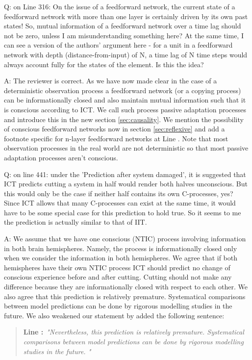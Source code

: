 \documentclass[utf8]{article}
\newcounter{cQuestion}[section]
\newenvironment{question}
    {\refstepcounter{cQuestion}\color{Blue}\noindent\newline Q\thecQuestion:}
    {~\newline}
\newenvironment{ans}  
    {\color{Black}\noindent A:}
    {~\newline}
\newcommand{\addnew}[2]{\blockcquote{}{\textbf{Line #1:}~\newline\textit{"#2"}}
}
\begin{document}
    
    	\begin{question}
            on Line 316: On the issue of a feedforward network, the current state of a feedforward network with more than one layer is certainly driven by its own past states! So, mutual information of a feedforward network over a time lag should not be zero, unless I am misunderstanding something here?
			At the same time, I can see a version of the authors' argument here - for a unit in a feedforward network with depth (distance-from-input) of N, a time lag of N time steps would always account fully for the states of the element. Is this the idea?		
    	\end{question}
    
 		\begin{ans}
 		    The reviewer is correct. As we have now made clear in the case of a deterministic observation process a feedforward network (or a copying process) can be informationally closed and also maintain mutual information such that it is conscious according to ICT. We call such process passive adaptation processes and introduce this in the new section \ref{sec:causality}. We mention the possibility of conscious feedforward networks now in section \ref{sec:reflexive} and add a footnote specific for n-layer feedforward networks at Line . Note that most observation processes in the real world are not deterministic so that most passive adaptation processes aren't conscious.
 		\end{ans}
 	
    
    	\begin{question}
    		on line 441: under the 'Prediction after system damaged', it is suggested that ICT predicts cutting a system in half would render both halves unconscious. But this would only be the case if neither half contains its own C-processes, yes? Since ICT allows that many C-processes can exist at the same time, it would have to be some special case for this prediction to hold true. So it seems to me the prediction is actually similar to that of IIT.
    	\end{question}
    
    
    	\begin{ans}
        	We assume that we have one conscious (NTIC) process involving information in both brain hemispheres. Namely, the process is informationally closed only when we consider the information in both hemispheres. We agree that if both hemispheres have their own NTIC process ICT should predict no change of conscious experience before and after cutting. Cutting should not make any difference because they are informationally closed with respect to each other. We also agree that this prediction is relatively premature. Systematical comparisons between model predictions can be done by rigorous modelling studies in the future. We also weakened our statement by added the following sentence:
        	
        	\addnew{}{Nevertheless, this prediction is relatively premature. Systematical comparisons between model predictions can be done by rigorous modelling studies in the future. }
        	
    	\end{ans}
    
\end{document}
